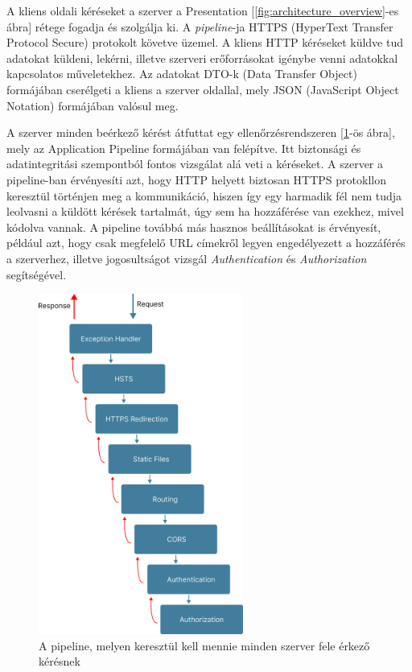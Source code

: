 A kliens oldali kéréseket a szerver a Presentation [\ref{fig:architecture_overview}-es ábra] rétege fogadja és szolgálja ki. A \textit{pipeline}-ja HTTPS (HyperText Transfer Protocol Secure)\cite{httpsdocs} protokolt követve üzemel. A kliens HTTP kéréseket küldve tud adatokat küldeni, lekérni, illetve szerveri erőforrásokat igénybe venni adatokkal kapcsolatos műveletekhez. Az adatokat DTO-k (Data Transfer Object)\cite{dtodocsmicrosoft} formájában cserélgeti a kliens a szerver oldallal, mely JSON (JavaScript Object Notation)\cite{jsondocs} formájában valósul meg. 

A szerver minden beérkező kérést átfuttat egy ellenőrzésrendszeren [\ref{fig:pipeline}-ös ábra], mely az Application Pipeline formájában van felépítve. Itt biztonsági és adatintegritási szempontból fontos vizsgálat alá veti a kéréseket. A szerver a pipeline-ban érvényesíti azt, hogy HTTP helyett biztosan HTTPS protokllon keresztül történjen meg a kommunikáció, hiszen így egy harmadik fél nem tudja leolvasni a küldött kérések tartalmát, úgy sem ha hozzáférése van ezekhez, mivel kódolva vannak. A pipeline továbbá más hasznos beállításokat is érvényesít, például azt, hogy csak megfelelő URL címekről legyen engedélyezett a hozzáférés a szerverhez, illetve jogosultságot vizsgál \textit{Authentication} és \textit{Authorization}\cite{authflowsdocs} segítségével.

\begin{figure}[h]
    \centering
    \includegraphics[width=0.6\textwidth]{./images/pipeline.png}
    \caption{A pipeline, melyen keresztül kell mennie minden szerver fele érkező kérésnek}
    \label{fig:pipeline}
\end{figure}

